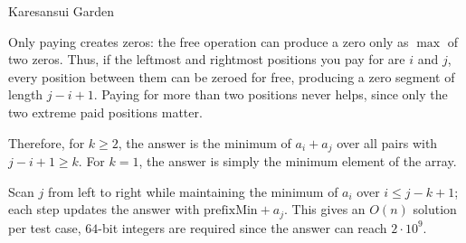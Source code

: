 \begin{tutorial}{Karesansui Garden}

Only paying creates zeros: the free operation can produce a zero only as $\max$ of two zeros. Thus, if the leftmost and rightmost positions you pay for are $i$ and $j$, every position between them can be zeroed for free, producing a zero segment of length $j - i + 1$. Paying for more than two positions never helps, since only the two extreme paid positions matter.

Therefore, for $k \ge 2$, the answer is the minimum of $a_i + a_j$ over all pairs with $j - i + 1 \ge k$. For $k = 1$, the answer is simply the minimum element of the array.

Scan $j$ from left to right while maintaining the minimum of $a_i$ over $i \le j - k + 1$; each step updates the answer with $\text{prefixMin} + a_j$. This gives an $O(n)$ solution per test case, $64$-bit integers are required since the answer can reach $2 \cdot 10^9$.


\end{tutorial}
